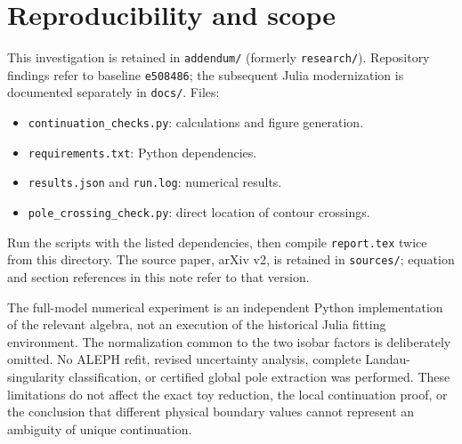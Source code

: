 \documentclass[11pt,a4paper]{article}
\begin{document}
\appendix
\section{Reproducibility and scope}
This investigation is retained in \texttt{addendum/} (formerly \texttt{research/}). Repository findings refer to baseline \texttt{e508486}; the subsequent Julia modernization is documented separately in \texttt{docs/}. Files:
\begin{itemize}
\item \texttt{continuation\_checks.py}: calculations and figure generation.
\item \texttt{requirements.txt}: Python dependencies.
\item \texttt{results.json} and \texttt{run.log}: numerical results.
\item \texttt{pole\_crossing\_check.py}: direct location of contour crossings.
\end{itemize}
Run the scripts with the listed dependencies, then compile \texttt{report.tex} twice from this directory. The source paper, arXiv v2, is retained in \texttt{sources/}; equation and section references in this note refer to that version.

The full-model numerical experiment is an independent Python implementation of the relevant algebra, not an execution of the historical Julia fitting environment. The normalization common to the two isobar factors is deliberately omitted. No ALEPH refit, revised uncertainty analysis, complete Landau-singularity classification, or certified global pole extraction was performed. These limitations do not affect the exact toy reduction, the local continuation proof, or the conclusion that different physical boundary values cannot represent an ambiguity of unique continuation.
\end{document}
